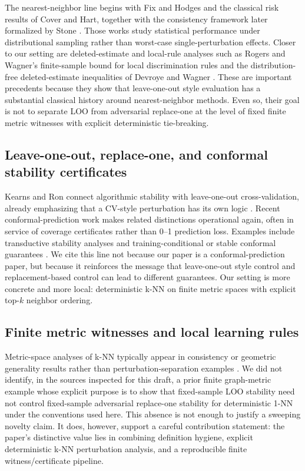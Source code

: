 The nearest-neighbor line begins with Fix and Hodges and the classical risk
results of Cover and Hart, together with the consistency framework later
formalized by Stone \cite{fix1951discriminatory,cover1967nearest,cover1968estimation,stone1977consistent}.  Those works study statistical performance under
distributional sampling rather than worst-case single-perturbation effects.
Closer to our setting are deleted-estimate and local-rule analyses such as
Rogers and Wagner's finite-sample bound for local discrimination rules and the
distribution-free deleted-estimate inequalities of Devroye and Wagner
\cite{rogers1978finite,devroye1979distribution,devroye1979local}.  These are
important precedents because they show that leave-one-out style evaluation has a
substantial classical history around nearest-neighbor methods.  Even so, their
goal is not to separate LOO from adversarial replace-one at the level of fixed
finite metric witnesses with explicit deterministic tie-breaking.

\subsection{Leave-one-out, replace-one, and conformal stability certificates}

Kearns and Ron connect algorithmic stability with leave-one-out
cross-validation, already emphasizing that a CV-style perturbation has its own
logic \cite{kearns1999algorithmic}.  Recent conformal-prediction work makes
related distinctions operational again, often in service of coverage
certificates rather than 0--1 prediction loss.  Examples include transductive
stability analyses and training-conditional or stable conformal guarantees
\cite{ndiaye2022stability,liang2023learning,pournaderi2024training,lee2025framework}.  We cite this line not because our paper is a conformal-prediction
paper, but because it reinforces the message that leave-one-out style control
and replacement-based control can lead to different guarantees.  Our setting is
more concrete and more local: deterministic k-NN on finite metric spaces with
explicit top-$k$ neighbor ordering.

\subsection{Finite metric witnesses and local learning rules}

Metric-space analyses of k-NN typically appear in consistency or geometric
generality results rather than perturbation-separation examples
\cite{collins2020consistency}.  We did not identify, in the sources inspected
for this draft, a prior finite graph-metric example whose explicit purpose is to
show that fixed-sample LOO stability need not control fixed-sample adversarial
replace-one stability for deterministic 1-NN under the conventions used here.
This absence is not enough to justify a sweeping novelty claim.  It does,
however, support a careful contribution statement: the paper's distinctive value
lies in combining definition hygiene, explicit deterministic k-NN perturbation
analysis, and a reproducible finite witness/certificate pipeline.

